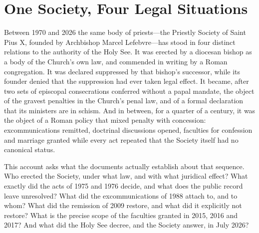 \section{One Society, Four Legal Situations}

Between 1970 and 2026 the same body of priests---the Priestly Society of
Saint Pius X, founded by Archbishop Marcel Lefebvre---has stood in four
distinct relations to the authority of the Holy See. It was erected by a
diocesan bishop as a body of the Church's own law, and commended in
writing by a Roman congregation. It was declared suppressed by that
bishop's successor, while its founder denied that the suppression had
ever taken legal effect. It became, after two sets of episcopal
consecrations conferred without a papal mandate, the object of the
gravest penalties in the Church's penal law, and of a formal declaration
that its ministers are in schism. And in between, for a quarter of a
century, it was the object of a Roman policy that mixed penalty with
concession: excommunications remitted, doctrinal discussions opened,
faculties for confession and marriage granted while every act repeated
that the Society itself had no canonical status.

This account asks what the documents actually establish about that
sequence. Who erected the Society, under what law, and with what
juridical effect? What exactly did the acts of 1975 and 1976 decide, and
what does the public record leave unresolved? What did the excommunications
of 1988 attach to, and to whom? What did the remission of 2009 restore,
and what did it explicitly not restore? What is the precise scope of the
faculties granted in 2015, 2016 and 2017? And what did the Holy See
decree, and the Society answer, in July 2026?


